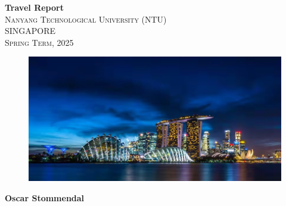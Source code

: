 \documentclass[a4paper, 12pt]{report}
\begin{document}
\thispagestyle{empty}
\vspace*{0.5cm}
\begin{center}
    {\Huge{\textbf{\noindent\hrulefill \hspace{1cm}Travel Report\hspace{1cm}\noindent\hrulefill}}} \\
    \vspace{0.5cm}
    {\large{\textsc{Nanyang Technological University (NTU) \\[0.1cm] SINGAPORE \\[0.2cm] Spring Term, 2025 \\[1cm]}}} 
    \begin{figure}[h]
        \centering
        \includegraphics[width=0.99\linewidth]{figs/title_fig.jpeg}
    \end{figure}
\end{center}
{\Large \textbf{Oscar Stommendal}}
\vspace{-0.3cm}

\noindent\hrulefill
\end{document}
